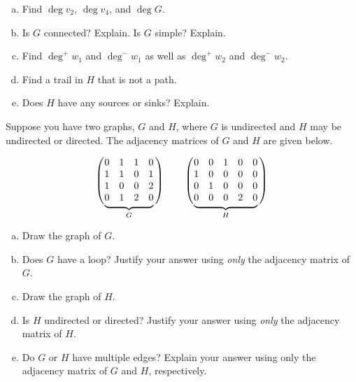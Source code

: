 \documentclass[11pt,letterpaper]{article}
\begin{document}
\begin{enumerate}[(a)]
\item Find $\deg v_2$, $\deg v_4$, and $\deg G$.
\item Is $G$ connected? Explain. Is $G$ simple? Explain.
\item Find $\deg^+ \!w_1$ and $\deg^- \!w_1$ as well as $\deg^+ \!w_2$ and $\deg^- \!w_2$. 
\item Find a trail in $H$ that is not a path. 
\item Does $H$ have any sources or sinks? Explain. 
\end{enumerate}



\newpage



 Suppose you have two graphs, $G$ and $H$, where $G$ is undirected and $H$ may be undirected or directed. The adjacency matrices of $G$ and $H$ are given below. \par
	\def\matrixG{%
	\begin{matrix}
	0 & 1 & 1 & 0 \\
	1 & 1 & 0 & 1 \\
	1 & 0 & 0 & 2 \\
	0 & 1 & 2 & 0 
	\end{matrix}
	}%
	\def\matrixH{%
	\begin{matrix}
	0 & 0 & 1 & 0 & 0 \\
	1 & 0 & 0 & 0 & 0 \\
	0 & 1 & 0 & 0 & 0 \\
	0 & 0 & 0 & 2 & 0 
	\end{matrix}
	}%
	\[
	\left(\vphantom{\matrixG} \right.\kern-2\nulldelimiterspace
  \underbrace{\matrixG}_{G} \kern-\nulldelimiterspace\left.\vphantom{\matrixG} \right) \qquad
  	\left(\vphantom{\matrixH} \right.\kern-2\nulldelimiterspace
  \underbrace{\matrixH}_{H} \kern-\nulldelimiterspace\left.\vphantom{\matrixH} \right)
	\]

\begin{enumerate}[(a)]
\item Draw the graph of $G$.
\item Does $G$ have a loop? Justify your answer using \textit{only} the adjacency matrix of $G$.
\item Draw the graph of $H$.
\item Is $H$ undirected or directed? Justify your answer using \textit{only} the adjacency matrix of $H$.
\item Do $G$ or $H$ have multiple edges? Explain your answer using only the adjacency matrix of $G$ and $H$, respectively. 
\end{enumerate}
\end{document}
